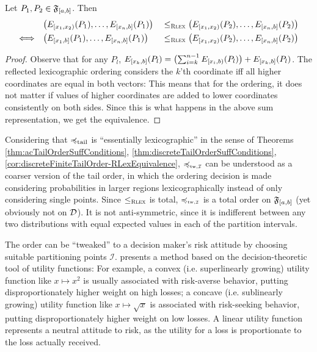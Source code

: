 \documentclass[a4paper]{scrreprt}
\begin{document}
    \begin{lemma}
        Let $P_1, P_2 \in \mathfrak{F}_{[a, b]}$.
        Then
        \begin{alignat*}{3}
                                     &\bigl(E_{[x_1, x_2)}(P_{1}), \dots, E_{[x_n, b]}(P_1)\bigr)\; &\leq_{\textsc{Rlex}} \bigl(E_{[x_1, x_2)}(P_2), \dots, E_{[x_n, b]}(P_2)\bigr) \\
            \Longleftrightarrow\quad &\bigl(E_{[x_1, b]}(P_{1}), \dots, E_{[x_n, b]}(P_1)\bigr) &\leq_{\textsc{Rlex}} \bigl(E_{[x_1, x_2)}(P_2), \dots, E_{[x_n, b]}(P_2)\bigr)
        \end{alignat*}
    \end{lemma}
    \begin{proof}
        Observe that for any $P_l$, $E_{[x_k, b]}(P_l) = \bigl(\sum_{i=k}^{n-1} E_{[x_i, b)}(P_l)\bigr) + E_{[x_k, b]}(P_l)$.
        The reflected lexicographic ordering considers the $k$'th coordinate iff all higher coordinates are equal in both vectors:
        This means that for the ordering, it does not matter if values of higher coordinates are added to lower coordinates consistently on both sides.
        Since this is what happens in the above sum representation, we get the equivalence.
    \end{proof}

    Considering that $\preccurlyeq_{\text{tail}}$ is “essentially lexicographic” in the sense of Theorems \ref{thm:acTailOrderSuffConditions}, \ref{thm:discreteTailOrderSuffConditions}, \ref{cor:discreteFiniteTailOrder-RLexEquivalence},
    $\leqtw$ can be understood as a coarser version of the tail order, in which the ordering decision is made considering probabilities in larger regions lexicographically instead of only considering single points.
    Since $\leq_{\textsc{Rlex}}$ is total, $\leqtw$ is a total order on $\mathfrak{F}_{[a, b]}$ (yet obviously not on $\mathcal{D}$). It is not anti-symmetric, since it is indifferent between any two distributions with equal expected values in each of the partition intervals.
    
    The order can be “tweaked” to a decision maker's risk attitude by choosing suitable partitioning points $\mathcal{I}$. \cite{bib:tweakableStochasticOrders} presents a method based on the decision-theoretic tool of utility functions: For example, a convex (i.e. superlinearly growing) utility function like $x \mapsto x^2$ is usually associated with risk-averse behavior, putting disproportionately higher weight on high losses; a concave (i.e. sublinearly growing) utility function like $x \mapsto \sqrt{x}$ is associated with risk-seeking behavior, putting disproportionately higher weight on low losses. A linear utility function represents a neutral attitude to risk, as the utility for a loss is proportionate to the loss actually received.
    
\end{document}
